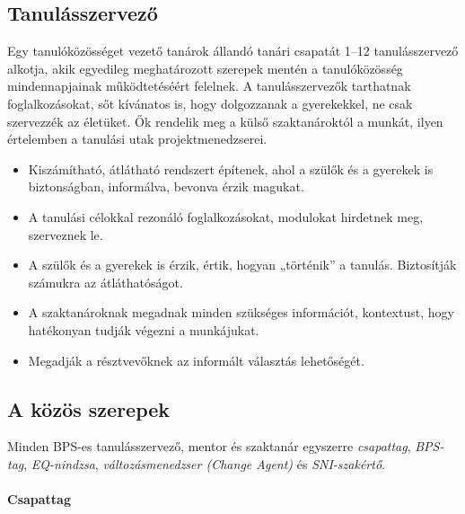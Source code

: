 \vspace*{.5ex}
\hypertarget{tanulasszervezo}{%
\subsection{Tanulásszervező}\label{tanulasszervezo}}

Egy tanulóközösséget vezető tanárok állandó tanári csapatát 1--12
tanulásszervező alkotja, akik egyedileg meghatározott szerepek mentén a
tanulóközösség mindennapjainak működtetéséért felelnek. A
tanulásszervezők tarthatnak foglalkozásokat, sőt kívánatos is, hogy
dolgozzanak a gyerekekkel, ne csak szervezzék az életüket. Ők rendelik
meg a külső szaktanároktól a munkát, ilyen értelemben a tanulási utak
projektmenedzserei.

\begin{itemize}
\tightlist
\item
  Kiszámítható, átlátható rendszert építenek, ahol a szülők és a gyerekek is
  biztonságban, informálva, bevonva érzik magukat.
\item
  A tanulási célokkal rezonáló foglalkozásokat, modulokat hirdetnek meg,
  szerveznek le.
\item
  A szülők és a gyerekek is érzik, értik, hogyan „történik'' a tanulás.
  Biztosítják számukra az átláthatóságot.
\item
  A szaktanároknak megadnak minden szükséges információt, kontextust, hogy
  hatékonyan tudják végezni a munkájukat.
\item
  Megadják a résztvevőknek az informált választás lehetőségét.
\end{itemize}

\hypertarget{a-kozos-szerepek}{%
\subsection{A közös szerepek}\label{a-kozos-szerepek}}

Minden BPS-es tanulásszervező, mentor és szaktanár egyszerre
\emph{csapattag}, \emph{BPS-tag}, \emph{EQ-nindzsa},
\emph{változásmenedzser (Change Agent)} és \emph{SNI-szakértő}.

\hypertarget{csapattag}{%
\paragraph{Csapattag}\label{csapattag}}

